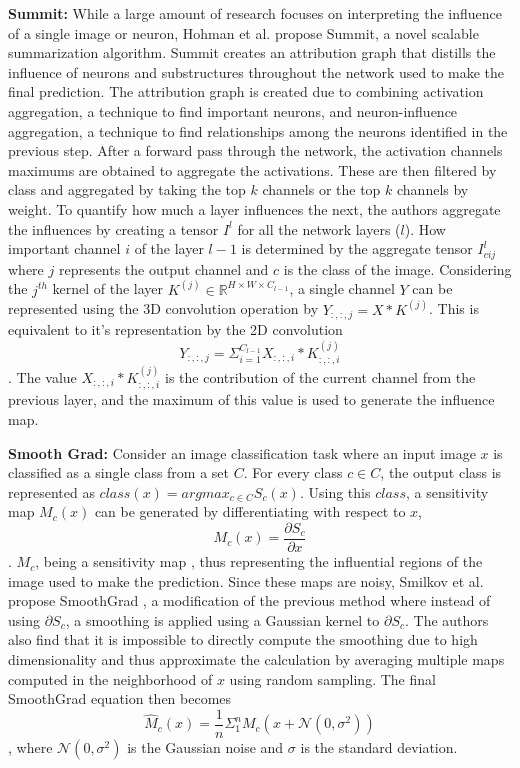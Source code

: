 \documentclass[a4paper,11pt,openright]{book}
\begin{document}
\textbf{Summit: }
While a large amount of research focuses on interpreting the influence of a single image or neuron, Hohman et al. propose Summit, \cite{hohmanSummitScalingDeep2019} a novel scalable summarization algorithm. Summit creates an attribution graph that distills the influence of neurons and substructures throughout the network used to make the final prediction. The attribution graph is created due to combining activation aggregation, a technique to find important neurons, and neuron-influence aggregation, a technique to find relationships among the neurons identified in the previous step. After a forward pass through the network, the activation channels maximums are obtained to aggregate the activations. These are then filtered by class and aggregated by taking the top $k$ channels or the top $k$ channels by weight. To quantify how much a layer influences the next, the authors aggregate the influences by creating a tensor $I^{l}$ for all the network layers ($l$). How important channel $i$ of the layer $l-1$ is determined by the aggregate tensor $I^{l}_{cij}$ where $j$ represents the output channel and $c$ is the class of the image. Considering the $j^{th}$ kernel of the layer $K^{(j)} \in \mathbb{R}^{H \times W \times C_{l-1}}$, a single channel $Y$ can be represented using the 3D convolution operation by $Y_{:,:,j}= X \ast K^{(j)}$. This is equivalent to it's representation by the 2D convolution $$Y_{:,:,j}= \Sigma_{i=1}^{C_{l-1}} X_{:,:,i} \ast K^{(j)}_{:,:,i}$$. The value $X_{:,:, i} \ast K^{(j)}_{:,:, i}$ is the contribution of the current channel from the previous layer, and the maximum of this value is used to generate the influence map.

\textbf{Smooth Grad: }
Consider an image classification task where an input image $x$ is classified as a single class from a set $C$. For every class $c \in C$, the output class is represented as $class(x) = argmax_{c \in C}S_{c}(x)$. Using this $class$, a sensitivity map $M_{c}(x)$ can be generated by differentiating with respect to $x$, $$M_{c}(x) = \frac{\partial S_{c}}{\partial x}$$ . $M_{c}$, being a sensitivity map \cite{simonyanDeepConvolutionalNetworks2014}, thus representing the influential regions of the image used to make the prediction. Since these maps are noisy, Smilkov et al. propose SmoothGrad \cite{smilkovSmoothGradRemovingNoise2017}, a modification of the previous method where instead of using $\partial S_{c}$, a smoothing is applied using a Gaussian kernel to $\partial S_{c}$. The authors also find that it is impossible to directly compute the smoothing due to high dimensionality and thus approximate the calculation by averaging multiple maps computed in the neighborhood of $x$ using random sampling. The final SmoothGrad equation then becomes $$\hat M_{c}(x) = \frac{1}{n}\Sigma_{1}^{n}M_{c}(x + \mathcal{N}(0, \sigma^{2}))$$, where $\mathcal{N}(0, \sigma^{2})$ is the Gaussian noise and $\sigma$ is the standard deviation.
\end{document}
